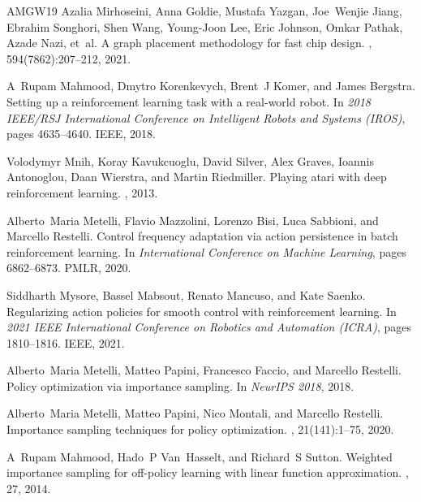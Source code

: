 \begin{thebibliography}{AMGW{\etalchar{+}}19}
Azalia Mirhoseini, Anna Goldie, Mustafa Yazgan, Joe~Wenjie Jiang, Ebrahim Songhori, Shen Wang, Young-Joon Lee, Eric Johnson, Omkar Pathak, Azade Nazi, et~al.
\newblock A graph placement methodology for fast chip design.
, 594(7862):207--212, 2021.

A~Rupam Mahmood, Dmytro Korenkevych, Brent~J Komer, and James Bergstra.
\newblock Setting up a reinforcement learning task with a real-world robot.
\newblock In {\em 2018 IEEE/RSJ International Conference on Intelligent Robots and Systems (IROS)}, pages 4635--4640. IEEE, 2018.

Volodymyr Mnih, Koray Kavukcuoglu, David Silver, Alex Graves, Ioannis Antonoglou, Daan Wierstra, and Martin Riedmiller.
\newblock Playing atari with deep reinforcement learning.
, 2013.

Alberto~Maria Metelli, Flavio Mazzolini, Lorenzo Bisi, Luca Sabbioni, and Marcello Restelli.
\newblock Control frequency adaptation via action persistence in batch reinforcement learning.
\newblock In {\em International Conference on Machine Learning}, pages 6862--6873. PMLR, 2020.

Siddharth Mysore, Bassel Mabsout, Renato Mancuso, and Kate Saenko.
\newblock Regularizing action policies for smooth control with reinforcement learning.
\newblock In {\em 2021 IEEE International Conference on Robotics and Automation (ICRA)}, pages 1810--1816. IEEE, 2021.

Alberto~Maria Metelli, Matteo Papini, Francesco Faccio, and Marcello Restelli.
\newblock Policy optimization via importance sampling.
\newblock In {\em NeurIPS 2018}, 2018.

Alberto~Maria Metelli, Matteo Papini, Nico Montali, and Marcello Restelli.
\newblock Importance sampling techniques for policy optimization.
, 21(141):1--75, 2020.

A~Rupam Mahmood, Hado~P Van~Hasselt, and Richard~S Sutton.
\newblock Weighted importance sampling for off-policy learning with linear function approximation.
, 27, 2014.


\end{thebibliography}
